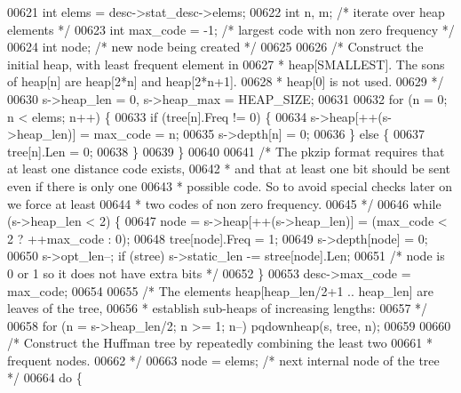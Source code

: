 \begin{DoxyCode}
{{{{{{{{{{{{00621     \textcolor{keywordtype}{int} elems             = desc->stat\_desc->elems;
00622     \textcolor{keywordtype}{int} n, m;          \textcolor{comment}{/* iterate over heap elements */}
00623     \textcolor{keywordtype}{int} max\_code = -1; \textcolor{comment}{/* largest code with non zero frequency */}
00624     \textcolor{keywordtype}{int} node;          \textcolor{comment}{/* new node being created */}
00625 
00626     \textcolor{comment}{/* Construct the initial heap, with least frequent element in}
00627 \textcolor{comment}{     * heap[SMALLEST]. The sons of heap[n] are heap[2*n] and heap[2*n+1].}
00628 \textcolor{comment}{     * heap[0] is not used.}
00629 \textcolor{comment}{     */}
00630     s->heap\_len = 0, s->heap\_max = HEAP\_SIZE;
00631 
00632     \textcolor{keywordflow}{for} (n = 0; n < elems; n++) \{
00633         \textcolor{keywordflow}{if} (tree[n].Freq != 0) \{
00634             s->heap[++(s->heap\_len)] = max\_code = n;
00635             s->depth[n] = 0;
00636         \} \textcolor{keywordflow}{else} \{
00637             tree[n].Len = 0;
00638         \}
00639     \}
00640 
00641     \textcolor{comment}{/* The pkzip format requires that at least one distance code exists,}
00642 \textcolor{comment}{     * and that at least one bit should be sent even if there is only one}
00643 \textcolor{comment}{     * possible code. So to avoid special checks later on we force at least}
00644 \textcolor{comment}{     * two codes of non zero frequency.}
00645 \textcolor{comment}{     */}
00646     \textcolor{keywordflow}{while} (s->heap\_len < 2) \{
00647         node = s->heap[++(s->heap\_len)] = (max\_code < 2 ? ++max\_code : 0);
00648         tree[node].Freq = 1;
00649         s->depth[node] = 0;
00650         s->opt\_len--; \textcolor{keywordflow}{if} (stree) s->static\_len -= stree[node].Len;
00651         \textcolor{comment}{/* node is 0 or 1 so it does not have extra bits */}
00652     \}
00653     desc->max\_code = max\_code;
00654 
00655     \textcolor{comment}{/* The elements heap[heap\_len/2+1 .. heap\_len] are leaves of the tree,}
00656 \textcolor{comment}{     * establish sub-heaps of increasing lengths:}
00657 \textcolor{comment}{     */}
00658     \textcolor{keywordflow}{for} (n = s->heap\_len/2; n >= 1; n--) pqdownheap(s, tree, n);
00659 
00660     \textcolor{comment}{/* Construct the Huffman tree by repeatedly combining the least two}
00661 \textcolor{comment}{     * frequent nodes.}
00662 \textcolor{comment}{     */}
00663     node = elems;              \textcolor{comment}{/* next internal node of the tree */}
00664     \textcolor{keywordflow}{do} \{
}}}}}}}}}}}}
\end{DoxyCode}
